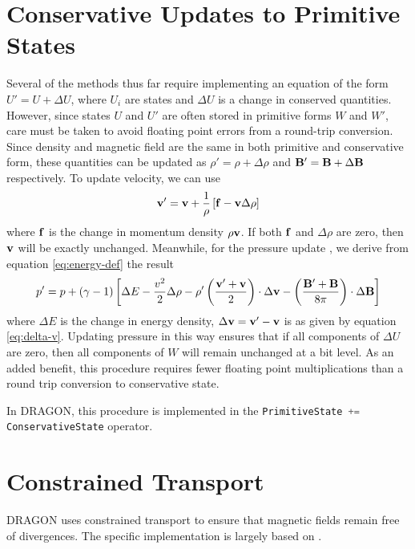 \documentclass[11pt]{report}
\newcommand{\cpp}[1]{\lstinline[language=C++]{#1}}
\begin{document}
\section{Conservative Updates to Primitive States} \label{sec:addition}

Several of the methods thus far require implementing an equation of the form $U' = U + \Delta U$, where $U_i$ are states and $\Delta U$ is a change in conserved quantities. However, since states $U$ and $U'$ are often stored in primitive forms $W$ and $W'$, care must be taken to avoid floating point errors from a round-trip conversion.
Since density and magnetic field are the same in both primitive and conservative form, these quantities can be updated as $\rho' = \rho + \Delta \rho$ and ${\bf B}' = {\bf B} + \Delta {\bf B} $ respectively. 
To update velocity, we can use
\begin{equation} {\bf v}' = {\bf v} + \frac{1}{\rho}\left[{\bf f} - {\bf v}\Delta\rho\right]\label{eq:delta-v}\end{equation}
where $\bf f$ is the change in momentum density $\rho{\bf v}$. If both ${\bf f}$ and $\Delta \rho$ are zero, then $\bf v$ will be exactly unchanged.
Meanwhile, for the pressure update , we derive from equation  \ref{eq:energy-def} the result
\begin{equation} p' =p + (\gamma-1)\left[\Delta E -  \frac{v^2}{2}\Delta \rho -  \rho'\left(\frac{\bf v'+v}{2}\right)\cdot\Delta{\bf v} - \left(\frac{\bf B' + B}{8\pi}\right)\cdot\Delta{\bf B}\right] \end{equation}
where $\Delta E$ is the change in energy density,  $\Delta \bf v = v'-v$ is as given by equation \ref{eq:delta-v}.
Updating pressure in this way ensures that if all components of $\Delta U$ are zero, then all components of $W$ will remain unchanged at a bit level. 
As an added benefit, this procedure requires fewer floating point multiplications than a round trip conversion to conservative state.

In DRAGON, this procedure is implemented in the \cpp{PrimitiveState += ConservativeState} operator.
 
 
 

\section{Constrained Transport} \label{sec:ct}

DRAGON uses constrained transport \citep{EvansHawley1988} to ensure that magnetic fields remain free of divergences.
The specific implementation is largely based on \citet{GardinerStone2008}.
\end{document}
